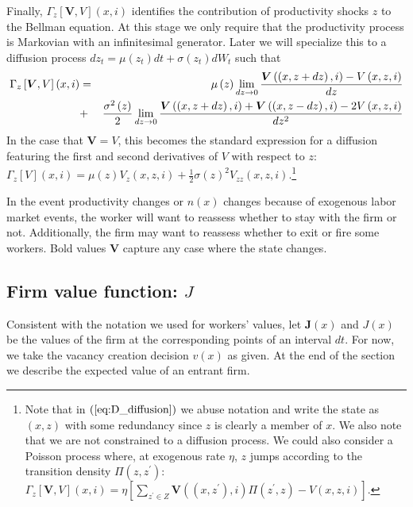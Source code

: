 Finally, $\Gamma _{z}\left[ \bm{V},V\right] \left( x,i\right) $
identifies the contribution of productivity shocks $z$ to the Bellman
equation. At this stage we only require that the productivity process is
Markovian with an infinitesimal generator. Later we will specialize this to
a diffusion process $dz_t = \mu(z_t)dt + \sigma(z_t) dW_t$ such that
\begin{eqnarray}
\Gamma _{z}\left[ \bm{V},V\right] \left( x,i\right) &=&\mu \left( z\right)
\lim_{dz\rightarrow 0}\frac{\bm{V}\left( \left( x,z+dz\right) ,i\right)
-V\left( x,z,i\right) }{dz} \notag \\
&+&\frac{\sigma ^{2}\left( z\right) }{2}%
\lim_{dz\rightarrow 0}\frac{\bm{V}\left( \left( x,z+dz\right) ,i\right) +%
\bm{V}\left( \left( x,z-dz\right) ,i\right) -2V\left( x,z,i\right) }{%
dz^{2}}  \label{eq:D_diffusion}
\end{eqnarray}
In the case that $\bm{V}=V$, this becomes the standard expression for
a diffusion featuring the first and second derivatives of $V$ with respect to $z$: $\Gamma_z[V](x,i) =
\mu(z)V_z(x,z,i) + \frac{1}{2}\sigma(z)^2V_{zz}(x,z,i)$.\footnote{%
Note that in $(\ref{eq:D_diffusion})$ we abuse notation and write the state
as $(x,z)$ with some redundancy since $z$ is clearly a member of $x$. We
also note that we are not constrained to a diffusion process. We could also
consider a Poisson process where, at exogenous rate $\eta$, $z$ jumps
according to the transition density $\Pi(z,z^\prime)$: $\Gamma _{z}\left[
\bm{V},V\right] \left( x,i\right) = \eta[\sum_{z^{\prime }\in Z}\bm{V%
}\left( \left( x,z^{\prime }\right) ,i\right) \Pi \left( z^{\prime
},z\right) -V\left( x,z,i\right)] $.}

In the event productivity changes or $n\left( x\right)$ changes because of
exogenous labor market events, the worker will want to reassess whether to
stay with the firm or not. Additionally, the firm may want to reassess
whether to exit or fire some workers. Bold values $\bm{V}$ capture any
case where the state changes.

\subsection{Firm value function: $J$}

Consistent with the notation we used for workers' values, let $\bm{J}(x)$
and $J(x)$ be the values of the firm at the corresponding points of an interval $dt$.
For now, we take the vacancy creation decision $v\left(
x\right)$ as given. At the end of the section we describe the expected value
of an entrant firm.


